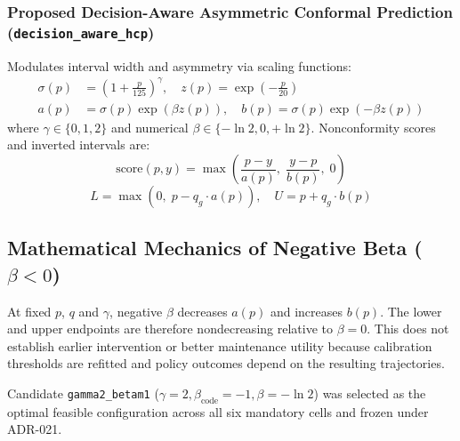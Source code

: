 \subsubsection{Proposed Decision-Aware Asymmetric Conformal Prediction (\texttt{decision\_aware\_hcp})}
Modulates interval width and asymmetry via scaling functions:
\begin{align}
\sigma(p) &= \left(1 + \frac{p}{125}\right)^\gamma, \quad z(p) = \exp\left(-\frac{p}{20}\right) \\
a(p) &= \sigma(p)\exp(\beta z(p)), \quad b(p) = \sigma(p)\exp(-\beta z(p))
\end{align}
where $\gamma \in \{0, 1, 2\}$ and numerical $\beta \in \{-\ln 2, 0, +\ln 2\}$. Nonconformity scores and inverted intervals are:
\begin{equation}
\text{score}(p, y) = \max\left(\frac{p - y}{a(p)}, \; \frac{y - p}{b(p)}, \; 0\right)
\end{equation}
\begin{equation}
L = \max(0, \; p - q_g \cdot a(p)), \quad U = p + q_g \cdot b(p)
\end{equation}

\subsection{Mathematical Mechanics of Negative Beta ($\beta < 0$)}
At fixed $p$, $q$ and $\gamma$, negative $\beta$ decreases $a(p)$ and increases $b(p)$. The lower and upper endpoints are therefore nondecreasing relative to $\beta=0$. This does not establish earlier intervention or better maintenance utility because calibration thresholds are refitted and policy outcomes depend on the resulting trajectories.

Candidate \texttt{gamma2\_betam1} ($\gamma=2, \beta_{\text{code}}=-1, \beta=-\ln 2$) was selected as the optimal feasible configuration across all six mandatory cells and frozen under ADR-021.
